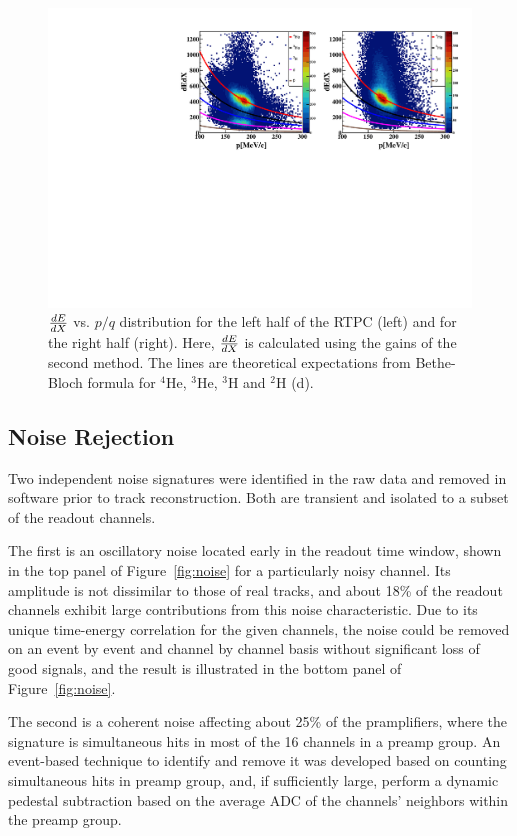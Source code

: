 \documentclass[twocolumn,showpacs,superscriptaddress,groupedaddress]{revtex4}
\begin{document}
\begin{figure}[tb]
\centering
\includegraphics[scale=0.45]{fig_2017/f_dedx_p_exp_2nd.pdf}
\caption{$\small{\frac{dE}{dX}}$ vs. $p/q$ distribution for the left half of 
   the RTPC (left) and for the right half (right). Here, 
   $\small{\frac{dE}{dX}}$ is calculated using the gains of the second method.  
   The lines are theoretical expectations from Bethe-Bloch formula for $^4$He, 
$^3$He, $^3$H and $^2$H (d).}
\label{fig:dedx_p_exp_2nd}
\end{figure}

\subsection{Noise Rejection}
Two independent noise signatures were identified in the raw data and removed in software prior to track reconstruction.  Both are transient and isolated to a subset of the readout channels. 

The first is an oscillatory noise located early in the readout time window, shown in the top panel of Figure~\ref{fig:noise} for a particularly noisy channel.  Its amplitude is not dissimilar to those of real tracks, and about 18\% of the readout channels exhibit large contributions from this noise characteristic.  Due to its unique time-energy correlation for the given channels, the noise could be removed on an event by event and channel by channel basis without significant loss of good signals, and the result is illustrated in the bottom panel of Figure~\ref{fig:noise}.

The second is a coherent noise affecting about 25\% of the pramplifiers, where the signature is simultaneous hits in most of the 16 channels in a preamp group.   An event-based technique to identify and remove it was developed based on counting simultaneous hits in preamp group, and, if sufficiently large, perform a dynamic pedestal subtraction based on the average ADC of the channels' neighbors within the preamp group.
\end{document}
